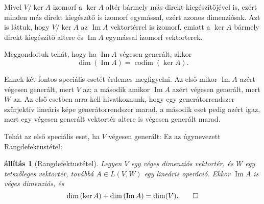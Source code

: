 \documentclass[a4paper, showtrims]{memoir}
\theoremstyle{plain}
\newtheorem{proposition}{állítás}[chapter]
\theoremstyle{remark}
\theoremstyle{definition}
\DeclareMathOperator{\codim}{codim}
\DeclareMathOperator{\im}{Im}
\begin{document}
Mivel $V/\ker{A}$ izomorf a $\ker A$ altér bármely más direkt kiegészítőjével is,
ezért minden más direkt kiegészítő is izomorf egymással, ezért azonos dimenziósak.
Azt is láttuk, hogy $V/\ker{A}$ az $\im A$ vektortérrel is izomorf, 
emiatt a $\ker A$ bármely direkt kiegészítő altere és $\im A$ egymással izomorf vektorterek.

Meggondoltuk tehát, hogy ha $\im A$ végesen generált, akkor
\[
    \dim(\im A)
    =
    \codim(\ker A).
\]

Ennek két fontos speciális esetét érdemes megfigyelni.
Az első mikor $\im A$ azért végesen generált, mert $V$ az;
a második amikor $\im A$ azért végesen generált, mert $W$ az.
Az első esetben arra kell hivatkoznunk, hogy egy generátorrendszer szürjektív lineáris képe generátorrendszer marad, a második eset pedig azért igaz, mert egy végesen generált vektortér altere is végesen 
generált marad.

Tehát az első speciális eset, ha $V$ végesen generált:
Ez az úgynevezett Rangdefektustétel:
\begin{proposition}[Rangdefektustétel]
	Legyen $V$ egy véges dimenziós vektortér,
	és $W$ egy tetszőleges vektortér,
	továbbá $A\in L\left( V,W \right)$ egy lineáris operáció.
	Ekkor
	$\im A$ is véges dimenziós, és
	\[
		\dim\left( \ker A \right)+\dim\left( \im A \right)=\dim(V).\qedhere
	\]
\end{proposition}
\end{document}
